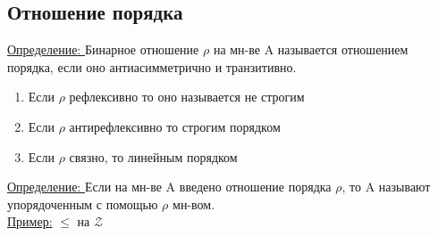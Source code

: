\documentclass[12pt]{article}
\begin{document}
    \subsection{Отношение порядка}
    \underline{Определение: } Бинарное отношение $\rho$ на мн-ве A называется отношением
    порядка, если оно антиасимметрично и транзитивно.
    \begin{enumerate}
        \item Если $\rho$ рефлексивно то оно называется не строгим
        \item Если $\rho$ антирефлексивно то строгим порядком
        \item Если $\rho$ связно, то линейным порядком
    \end{enumerate}
    \underline{Определение: } Если на мн-ве A введено отношение порядка $\rho$, то A
    называют упорядоченным с помощью $\rho$ мн-вом.\\
    \underline{Пример:} $\leq$ на $\mathcal{Z}$
\end{document}
